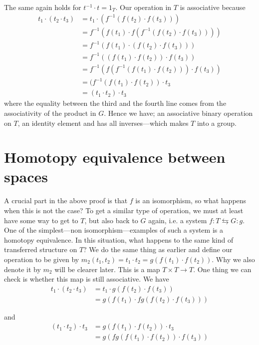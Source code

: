  
The same again holds for $ t^{-1}\cdot t = 1_T$. Our operation in $T$ is associative because
\begin{align*} 
t_1\cdot (t_2\cdot t_3) 
&= t_1\cdot (f^{-1}(f(t_2)\cdot f(t_3)))\\ 
&= f^{-1}(f(t_1)\cdot f(f^{-1}(f(t_2)\cdot f(t_3)))) \\ 
&= f^{-1}(f(t_1)\cdot (f(t_2)\cdot f(t_3))) \\ 
&= f^{-1}((f(t_1)\cdot f(t_2))\cdot f(t_3)) \\ 
&= f^{-1}(f(f^{-1}(f(t_1)\cdot f(t_2)))\cdot f(t_3)) \\ 
&= (f^{-1}(f(t_1)\cdot f(t_2))\cdot t_3 \\ 
&= (t_1\cdot t_2)\cdot t_3 
\end{align*}
where the equality between the third and the fourth line comes from the associativity of the product in $G$. Hence we have; an associative binary operation on $T$, an identity element and has all inverses---which makes $T$ into a group.

\section{Homotopy equivalence between spaces}

A crucial part in the above proof is that $f$ is an isomorphism, so what happens when this is not the case? To get a similar type of operation, we must at least have some way to get to $T$, but also back to $G$ again, i.e. a system $f\colon T\leftrightarrows G\colon g$. One of the simplest---non isomorphism---examples of such a system is a homotopy equivalence. In this situation, what happens to the same kind of transferred structure on $T$? We do the same thing as earlier and define our operation to be given by $m_2(t_1, t_2)=t_1\cdot t_2 = g(f(t_1)\cdot f(t_2))$. Why we also denote it by $ m_2$ will be clearer later. This is a map $ T\times T\longrightarrow T$. One thing we can check is whether this map is still associative. We have
\begin{align*} 
t_1\cdot (t_2 \cdot t_3) 
&= t_1\cdot g(f(t_2)\cdot f(t_3)) \\ 
&= g(f(t_1)\cdot fg(f(t_2)\cdot f(t_3))) 
\end{align*}

and
\begin{align*} 
(t_1\cdot t_2) \cdot t_3 
&= g(f(t_1)\cdot f(t_2)) \cdot t_3\\ 
&= g(fg(f(t_1)\cdot f(t_2))\cdot f(t_3)) 
\end{align*}

